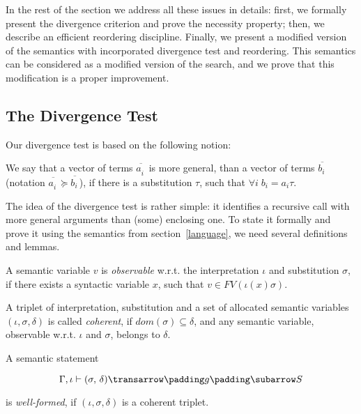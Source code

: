 In the rest of the section we address all these issues in details: first, we formally present the divergence
criterion and prove the necessity property; then, we describe an efficient reordering discipline. Finally, we present a
modified version of the semantics with incorporated divergence test and reordering. This semantics can be
considered as a modified version of the search, and we prove that this modification is a proper improvement.

\subsection{The Divergence Test}

Our divergence test is based on the following notion:

\begin{definition}
\normalfont 
We say that a vector of terms $\overline{a^{\phantom{x}}_i}$ is more general, than a vector of terms $\overline{b^{\phantom{x}}_i}$ (notation 
$\overline{a^{\phantom{x}}_i}\succeq\overline{b^{\phantom{x}}_i}$), if there is a substitution $\tau$, such that $\forall i\;b_i = a_i \tau$.
\end{definition}

The idea of the divergence test is rather simple: it identifies a recursive call with more general arguments 
than (some) enclosing one. To state it formally and prove it using the semantics from section~\ref{language}, we need several definitions and lemmas.

\begin{definition}
\normalfont
A semantic variable $v$ is \emph{observable} w.r.t. the interpretation $\iota$ and substitution $\sigma$, if there exists 
a syntactic variable $x$, such that \mbox{$v \in FV(\iota(x) \sigma)$}.
\end{definition}

\begin{definition}
A triplet of interpretation, substitution and a set of allocated semantic variables \mbox{$(\iota,\sigma,\delta)$} is
called \emph{coherent}, if \mbox{$dom(\sigma) \subseteq \delta$}, and any semantic variable, observable w.r.t. $\iota$ and $\sigma$,
belongs to $\delta$.  
\end{definition}

\begin{definition}
\normalfont
A semantic statement 

$$
\otrans{\Gamma,\iota}{(\sigma,\,\delta)}{g}{S}
$$ 

\noindent is \emph{well-formed}, if \mbox{$(\iota,\sigma,\delta)$} is a coherent triplet.
\end{definition}

